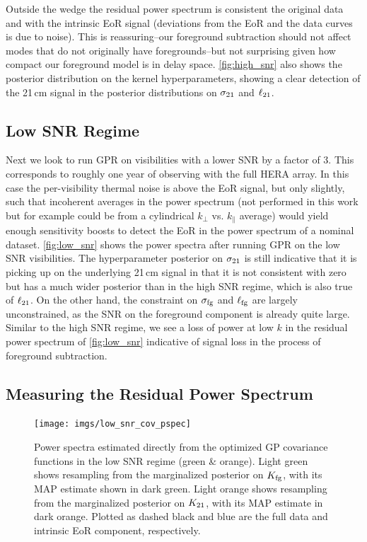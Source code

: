 \documentclass[a4paper,fleqn,usenatbib]{mnras}
\def\para{\parallel}
\def\Kto{K_{\rm 21}}
\def\Kfg{K_{\rm fg}}
\def\sigmafg{\sigma_{\rm fg}}
\def\ellfg{\ell_{\rm fg}}
\def\sigmato{\sigma_{\rm 21}}
\def\ellto{\ell_{\rm 21}}
\begin{document}
Outside the wedge the residual power spectrum is consistent the original data and with the intrinsic EoR signal (deviations from the EoR and the data curves is due to noise).
This is reassuring--our foreground subtraction should not affect modes that do not originally have foregrounds--but not surprising given how compact our foreground model is in delay space.
\autoref{fig:high_snr} also shows the posterior distribution on the kernel hyperparameters, showing a clear detection of the 21\,cm signal in the posterior distributions on $\sigmato$ and $\ellto$.


\subsection{Low SNR Regime}
\label{sec:low_snr}

Next we look to run GPR on visibilities with a lower SNR by a factor of 3.
This corresponds to roughly one year of observing with the full HERA array.
In this case the per-visibility thermal noise is above the EoR signal, but only slightly, such that incoherent averages in the power spectrum (not performed in this work but for example could be from a cylindrical $k_\perp$ vs. $k_\para$ average) would yield enough sensitivity boosts to detect the EoR in the power spectrum of a nominal dataset.
\autoref{fig:low_snr} shows the power spectra after running GPR on the low SNR visibilities.
The hyperparameter posterior on $\sigmato$ is still indicative that it is picking up on the underlying 21\,cm signal in that it is not consistent with zero but has a much wider posterior than in the high SNR regime, which is also true of $\ellto$.
On the other hand, the constraint on $\sigmafg$ and $\ellfg$ are largely unconstrained, as the SNR on the foreground component is already quite large.
Similar to the high SNR regime, we see a loss of power at low $k$ in the residual power spectrum of \autoref{fig:low_snr} indicative of signal loss in the process of foreground subtraction.

\subsection{Measuring the Residual Power Spectrum}
\label{sec:pspec_bias}

\begin{figure}
\centering
\texttt{[image: imgs/low\_snr\_cov\_pspec]}
\caption{Power spectra estimated directly from the optimized GP covariance functions in the low SNR regime (green \& orange). Light green shows resampling from the marginalized posterior on $\Kfg$, with its MAP estimate shown in dark green. Light orange shows resampling from the marginalized posterior on $\Kto$, with its MAP estimate in dark orange. Plotted as dashed black and blue are the full data and intrinsic EoR component, respectively.}
\label{fig:low_snr_cov_pspec}
\end{figure}
\end{document}

